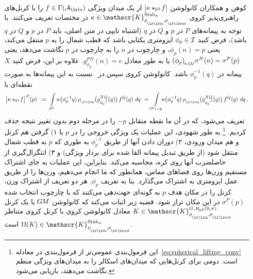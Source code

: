 کوهن و همکاران\cite{Cohen2018-intertwiners} کانولوشن ${[\kappa \star_{\mkern-2mu S^2}\! f]}$ از یک میدان ویژگی $f\in\Gamma(\Ain)$ را با کرنل‌های راهبری‌پذیر کروی $\kappa \in \mathscr{K}^{\Stab{n}}_{\rhoin\mkern-1mu,\rhoout}$ در مختصات تعریف می‌کنند.
با توجه به پیمانه‌های $P$ در $p$ و $Q$ در $q$ (اشتباه تایپی در متن اصلی، باید $P$ در $p$ و $Q$ در $q$ باشد)، فرض کنید $\phi_p \in \mathcal{I}$ ایزومتری یکتایی باشد که قطب شمال را به $p$ منتقل می‌کند، یعنی $\phi_p(n) = p$، و چارچوب در $n$ را به چارچوب در $p$ نگاشت می‌دهد، یعنی $\dphipGM \sigma^N(n) = \sigma^P(p)$ یا به طور معادل $g_{\phi_p}^{PN}(n) = e$.
علاوه بر این، فرض کنید $X$ پیمانه در $\phi_p^{-1}(q)$ باشد.
کانولوشن کروی سپس در~\cite{Cohen2018-intertwiners} نسبت به این پیمانه‌ها به صورت نقطه‌ای با
\begin{align}\label{eq:spherical_steerable_conv}
	\big[\kappa \star_{\mkern-2mu S^2}\! f\big]^P(p)
	\ :=\ \int\limits_{S^2} \kappa\big(\phi_p^{-1}q)\, \rhoin\big( g_{\phi_p^{-1}}^{XQ}(q) \big)\, f^Q(q)\ dq
	\ = \int\limits_{S^2 \backslash \mkern-2mu -p} \mkern-8mu \kappa\big(\phi_p^{-1}q)\, \rhoin\big( g_{\phi_p^{-1}}^{XQ}(q) \big)\, f^Q(q)\ dq \,,
\end{align}
تعریف می‌شود، که در آن ما نقطه متقابل $-p$ را در مرحله دوم بدون تغییر نتیجه حذف کردیم.%
\footnote{
	این فرمول‌بندی عمومی‌تر از فرمول‌بندی در معادله~\eqref{eq:spherical_lifting_conv} است.
	دومی برای کرنل‌هایی که میدان‌های اسکالر را به میدان‌های ویژگی منظم نگاشت می‌دهند، بازیابی می‌شود.
}
به طور شهودی، این عملیات یک ویژگی خروجی را در $p$ با
۱) گرفتن هم کرنل و هم میدان ورودی،
۲) دوران دادن آنها از طریق $\phi_p^{-1}$ به طوری که $p$ به قطب شمال منتقل شود (از طریق تبدیل پیمانه القا شده برای بردار ویژگی) و
۳) انتگرال‌گیری از حاصلضرب آنها روی کره، محاسبه می‌کند.
بنابراین، این عملیات به جای اشتراک مستقیم وزن‌ها روی فضاهای مماس، همانطور که ما انجام می‌دهیم، وزن‌ها را از طریق عمل ایزومتری به اشتراک می‌گذارد.
بنا به تعریف $\phi_p$, هر دو تعریف از اشتراک وزن، کرنل را در مکان هدف $p$ به گونه‌ای جهت‌دهی می‌کنند که با چارچوب انتخاب شده $\sigma^P(p)$ در این مکان تراز شود.
قضیه زیر اثبات می‌کند که کانولوشن $G\mkern-1.4muM$ با یک کرنل $K \in \mathscr{K}^{G,B_{\R^2}(0,\pi)}_{\rhoin\mkern-1mu,\rhoout}$ معادل کانولوشن کروی با کرنل کروی متناظر $\Omega(K) \in \mathscr{K}^{\Stab{n}}_{\rhoin\mkern-1mu,\rhoout}$ است.
